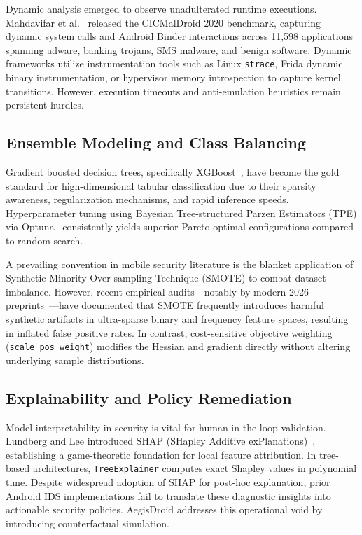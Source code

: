 \documentclass[10pt,journal,compsoc]{IEEEtran}
\begin{document}
Dynamic analysis emerged to observe unadulterated runtime executions. Mahdavifar et al.~\cite{mahdavifar2020cicmaldroid} released the CICMalDroid 2020 benchmark, capturing dynamic system calls and Android Binder interactions across 11,598 applications spanning adware, banking trojans, SMS malware, and benign software. Dynamic frameworks utilize instrumentation tools such as Linux \texttt{strace}, Frida dynamic binary instrumentation, or hypervisor memory introspection to capture kernel transitions. However, execution timeouts and anti-emulation heuristics remain persistent hurdles.

\subsection{Ensemble Modeling and Class Balancing}
Gradient boosted decision trees, specifically XGBoost~\cite{chen2016xgboost}, have become the gold standard for high-dimensional tabular classification due to their sparsity awareness, regularization mechanisms, and rapid inference speeds. Hyperparameter tuning using Bayesian Tree-structured Parzen Estimators (TPE) via Optuna~\cite{akiba2019optuna} consistently yields superior Pareto-optimal configurations compared to random search.

A prevailing convention in mobile security literature is the blanket application of Synthetic Minority Over-sampling Technique (SMOTE) to combat dataset imbalance. However, recent empirical audits—notably by modern 2026 preprints~\cite{malware2026resampling}—have documented that SMOTE frequently introduces harmful synthetic artifacts in ultra-sparse binary and frequency feature spaces, resulting in inflated false positive rates. In contrast, cost-sensitive objective weighting (\texttt{scale\_pos\_weight}) modifies the Hessian and gradient directly without altering underlying sample distributions.

\subsection{Explainability and Policy Remediation}
Model interpretability in security is vital for human-in-the-loop validation. Lundberg and Lee introduced SHAP (SHapley Additive exPlanations)~\cite{lundberg2017unified}, establishing a game-theoretic foundation for local feature attribution. In tree-based architectures, \texttt{TreeExplainer} computes exact Shapley values in polynomial time. Despite widespread adoption of SHAP for post-hoc explanation, prior Android IDS implementations fail to translate these diagnostic insights into actionable security policies. AegisDroid addresses this operational void by introducing counterfactual simulation.
\end{document}
